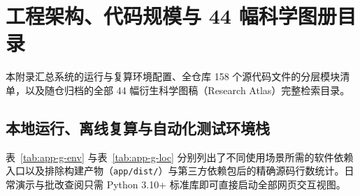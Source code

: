\chapter{工程架构、代码规模与 44 幅科学图册目录}\label{app:environment}

本附录汇总系统的运行与复算环境配置、全仓库 158 个源代码文件的分层模块清单，以及随仓归档的全部 44 幅衍生科学图稿（Research Atlas）完整检索目录。

\section{本地运行、离线复算与自动化测试环境栈}

表~\ref{tab:app-g-env} 与表~\ref{tab:app-g-loc} 分别列出了不同使用场景所需的软件依赖入口以及排除构建产物（\texttt{app/dist/}）与第三方依赖包后的精确源码行数统计。日常演示与批改查阅只需 Python 3.10+ 标准库即可直接启动全部网页交互视图。

